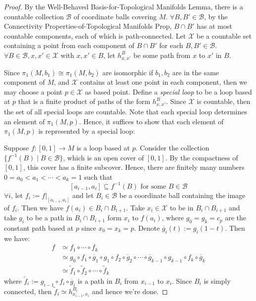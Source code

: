 \begin{proof}
    By the Well-Behaved Basis-for-Topological Manifolds Lemma, there is a countable collection $\mathcal{B}$ of coordinate balls covering $M$. $\forall B,B' \in \mathcal{B}$, by the Connectivity Properties-of-Topological Manifolds Prop, $B\cap B'$ has at most countable components, each of which is path-connected. Let $\mathcal{X}$ be a countable set containing a point from each component of $B\cap B'$ for each $B,B'\in \mathcal{B}$. $\forall B\in \mathcal{B}, x,x'\in \mathcal{X}$ with $x,x'\in B$, let $h_{x,x'}^B$ be some path from $x$ to $x'$ in $B$.

    Since $\pi_1 (M,b_1) \cong \pi_1 (M,b_2)$ are isomorphic if $b_1,b_2$ are in the same component of $M$, and $\mathcal{X}$ contains at least one point in each component, then we may choose a point $p\in \mathcal{X}$ as based point. Define a \textit{special loop} to be a loop based at $p$ that is a finite product of paths of the form $h_{x,x'}^B$. Since $\mathcal{X}$ is countable, then the set of all special loops are countable. Note that each special loop determines an element of $\pi_1 (M,p)$. Hence, it suffices to show that each element of $\pi_1 (M,p)$ is represented by a special loop:

    Suppose $f:[0,1] \to M$ is a loop based at $p$. Consider the collection $\{f^{-1} (B) \mid B\in \mathcal{B} \}$, which is an open cover of $[0,1]$. By the compactness of $[0,1]$, this cover has a finite subcover. Hence, there are finitely many numbers $0= a_0 <a_1 <\cdots< a_k=1$ such that
    \[
    [a_{i-1},a_i] \subseteq f^{-1} (B) \text{ for some } B\in \mathcal{B}
    \]
    $\forall i$, let $f_i:= f|_{[a_{i-1},a_i]}$ and let $B_i\in \mathcal{B}$ be a coordinate ball containing the image of $f_i$. Then we have $f(a_i) \in B_i \cap B_{i+1}$. Take $x_i \in \mathcal{X}$ to be in $B_i \cap B_{i+1}$ and take $g_i$ to be a path in $B_i \cap B_{i+1}$ form $x_i$ to $f(a_i)$, where $g_0=g_k=c_p$ are the constant path based at $p$ since $x_0=x_k=p$. Denote $\overline{g}_i (t):= g_i(1-t)$. Then we have:
    \begin{align*}
        f &\simeq f_1 \circ \cdots \circ f_k\\
        &\simeq g_0 \circ f_1 \circ \overline{g}_1 \circ g_1 \circ f_2 \circ \overline{g}_2 \circ \cdots \circ \overline{g}_{k-1} \circ g_{k-1} \circ f_k \circ \overline{g}_k\\
        &\simeq \tilde{f}_1 \circ \tilde{f}_2 \circ \cdots \circ \tilde{f}_k
    \end{align*}
    where $\tilde{f}_i:= g_{i-1} \circ f_i \circ \overline{g}_i$ is a path in $B_i$ from $x_{i-1}$ to $x_i$. Since $B_i$ is simply connected, then $\tilde{f}_i \simeq h_{x_{i-1}, x_i}^{B_i}$ and hence we're done.
\end{proof}

